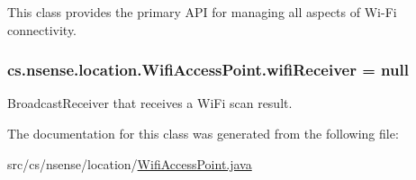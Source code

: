 This class provides the primary A\-P\-I for managing all aspects of Wi-\/\-Fi connectivity. \hypertarget{classcs_1_1nsense_1_1location_1_1_wifi_access_point_ad6ce8a0c2df158208998e575b588eb42}{
\subsubsection[{wifi\-Receiver}]{ cs.\-nsense.\-location.\-Wifi\-Access\-Point.\-wifi\-Receiver = null\hspace{0.3cm}{\ttfamily [private]}}}\label{classcs_1_1nsense_1_1location_1_1_wifi_access_point_ad6ce8a0c2df158208998e575b588eb42}
Broadcast\-Receiver that receives a Wi\-Fi scan result. 

The documentation for this class was generated from the following file\-:\begin{DoxyCompactItemize}
\item 
src/cs/nsense/location/\hyperlink{_wifi_access_point_8java}{Wifi\-Access\-Point.\-java}\end{DoxyCompactItemize}
